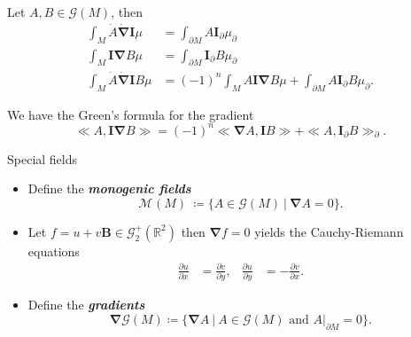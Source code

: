 \documentclass[aspectratio=169]{beamer}
\newcommand\boldgreen[1]{\textcolor{lighter_csu_green}{\emph{\textbf{#1}}}}
\newcommand{\R}{\mathbb{R}}
\newcommand{\grad}{\boldsymbol{\nabla}}
\newcommand{\G}{\mathcal{G}}
\newcommand{\blade}[1]{\boldsymbol{#1}}
\newcommand{\multivecinnerproduct}[2]{\ll #1, #2\gg}
\newcommand{\boundary}{{\partial M}}
\newcommand{\pseudoscalar}{\blade{I}}
\newcommand{\monogenicfields}[1]{\mathcal{M}^{#1}(M)}
\begin{document}
\begin{frame}{}
\vfill
\begin{theorem}
Let $A,B \in \G(M)$, then
\begin{align*}
\int_M \dot{A}\dot{\grad}\pseudoscalar \mu &= \int_\boundary A \pseudoscalar_\partial \mu_\partial\\
\int_M \pseudoscalar \grad B \mu &= \int_\boundary \pseudoscalar_\partial B\mu_\partial\\
\int_M \dot{A}\dot{\grad} \pseudoscalar B \mu &= (-1)^n \int_M A \pseudoscalar \grad B \mu + \int_\boundary A \pseudoscalar_\partial B \mu_\partial.
\end{align*}
\end{theorem}
\vfill
\end{frame}

\begin{frame}{}
\vfill
\begin{theorem}
We have the Green's formula for the gradient
\[
\multivecinnerproduct{A}{\pseudoscalar \grad B} = (-1)^n \multivecinnerproduct{\grad A}{\pseudoscalar B} + \multivecinnerproduct{A}{\pseudoscalar_\partial B}_\partial.
\]
\end{theorem}
%
\vfill
\end{frame}


\begin{frame}{Special fields}
\vfill
\begin{itemize}
\pause
\item Define the \boldgreen{monogenic fields}
\[
\monogenicfields{} ~\coloneqq \{ A \in \G(M) ~\vert~ \grad A = 0 \}.
\]
\vspace*{-0.25cm}
\pause
\item Let $f=u+v\blade{B} \in \G_2^+(\R^2)$ then $\grad f = 0$ yields the Cauchy-Riemann equations
\begin{align*}
    \frac{\partial u}{\partial x} &= \frac{\partial v}{\partial y}, &
    \frac{\partial u}{\partial y} &= -\frac{\partial v}{\partial x}.
\end{align*}
\pause
\vspace*{-0.25cm}
\item Define the \boldgreen{gradients}
\[
\grad \G(M) \coloneqq \{\grad A ~\vert~ A \in \G(M) \textrm{~and~} A\vert_\boundary = 0 \}.
\]
\end{itemize}
\vfill
\end{frame}
\end{document}
